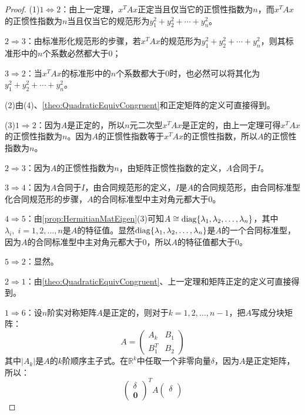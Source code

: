 \begin{proof}
	(1)$1\iff2$：由上一定理，$x^TAx$正定当且仅当它的正惯性指数为$n$，而$x^TAx$的正惯性指数为$n$当且仅当它的规范形为$y_1^2+y_2^2+\cdots+y_n^2$。\par
	$2\Rightarrow3$：由标准形化规范形的步骤，若$x^TAx$的规范形为$y_1^2+y_2^2+\cdots+y_n^2$，则其标准形中的$n$个系数必然都大于$0$；\par
	$3\Rightarrow2$：当$x^TAx$的标准形中的$n$个系数都大于$0$时，也必然可以将其化为$y_1^2+y_2^2+\cdots+y_n^2$。\par
	(2)由(4)、\cref{theo:QuadraticEquivCongruent}和正定矩阵的定义可直接得到。\par	
	(3)$1\Rightarrow2$：因为$A$是正定的，所以$n$元二次型$x^TAx$是正定的，由上一定理可得$x^TAx$的正惯性指数为$n$。因为$A$的正惯性指数等于$x^TAx$的正惯性指数，所以$A$的正惯性指数为$n$。\par
	$2\Rightarrow3$：因为$A$的正惯性指数为$n$，由矩阵正惯性指数的定义，$A$合同于$I$。\par
	$3\Rightarrow4$：因为$A$合同于$I$，由合同规范形的定义，$I$是$A$的合同规范形，由合同标准型化合同规范形的步骤，$A$的合同标准型中主对角元都大于$0$。\par
	$4\Rightarrow5$：由\cref{prop:HermitianMatEigen}(3)可知$A\cong\operatorname{diag}\{\lambda_1, \lambda_2, \dots, \lambda_{n}\}$，其中$\lambda_i,\;i=1,2,\dots,n$是$A$的特征值。显然$\operatorname{diag}\{\lambda_1, \lambda_2, \dots, \lambda_{n}\}$是$A$的一个合同标准型，因为$A$的合同标准型中主对角元都大于$0$，所以$A$的特征值都大于$0$。
	\par
	$5\Rightarrow2$：显然。\par
	$2\Rightarrow1$：由\cref{theo:QuadraticEquivCongruent}、上一定理和矩阵正定的定义可直接得到。\par
	$1\Rightarrow6$：设$n$阶实对称矩阵$A$是正定的，则对于$k=1,2,\dots,n-1$，把$A$写成分块矩阵：
	\begin{equation*}
		A=
		\begin{pmatrix}
			A_k & B_1 \\
			B_1^T & B_2
		\end{pmatrix}
	\end{equation*}
	其中$|A_k|$是$A$的$k$阶顺序主子式。在$\mathbb{R}^{k}$中任取一个非零向量$\delta$，因为$A$是正定矩阵，所以：
	\begin{equation*}
		\begin{pmatrix}
			\delta \\
			\mathbf{0}
		\end{pmatrix}^T
		A
		\begin{pmatrix}
			\delta \\

\end{pmatrix}
\end{equation*}
\end{proof}
